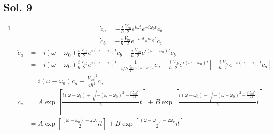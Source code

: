 \subsection*{Sol. 9}
\begin{enumerate}
    \item
          \begin{align*}
              \dot c_a = -\frac{i}{\hbar}\frac{V_{ab}}{2}e^{i\omega t}e^{-i\omega_0 t}c_b
          \end{align*}
          \begin{align*}
              \dot c_b = -\frac{i}{\hbar}\frac{V_{ba}}{2}e^{-i\omega t}e^{i\omega_0 t}c_a
          \end{align*}
          \begin{align*}
              \ddot c_a & = -i(\omega -\omega_0)\frac{i}{\hbar}\frac{V_{ab}}{2}e^{i(\omega -\omega_0)t}c_b
              -\frac{i}{\hbar}\frac{V_{ab}}{2}e^{i(\omega -\omega_0)t}\dot c_b \\
                        & =
              -i(\omega -\omega_0)\frac{i}{\hbar}\frac{V_{ab}}{2}e^{i(\omega -\omega_0)t}
              \frac{1}{-i/\hbar \frac{V_{ab}}{2}e^{i(\omega-\omega_0)t}}\dot c_a
              -\frac{i}{\hbar}\frac{V_{ab}}{2}e^{i(\omega -\omega_0)t}\left[
                                                                          -\frac{i}{\hbar}\frac{V_{ba}}{2}e^{-i(\omega-\omega_0) t}c_a
                                                                          \right] \\
                        & =
              i(\omega-\omega_0)\dot c_a
              -\frac{|V_{ab}|^2}{4\hbar^2}c_a
          \end{align*}
          \begin{align*}
              c_a & = A\exp\left[
                               \frac{i(\omega-\omega_0) + \sqrt{-(\omega - \omega_0)^2 - \frac{|V_{ab}|^2}{\hbar^2}}}{2} t
                               \right]
              +B\exp\left[
                        \frac{i(\omega-\omega_0) - \sqrt{-(\omega - \omega_0)^2 - \frac{|V_{ab}|^2}{\hbar^2}}}{2} t
                        \right] \\
                  & =
              A\exp\left[
                       \frac{(\omega-\omega_0) + 2\omega_r}{2} it
                       \right]
              +B\exp\left[
                        \frac{(\omega-\omega_0) - 2\omega_r}{2} it
                        \right]
          \end{align*}
          \begin{align*}

\end{align*}
\end{enumerate}
